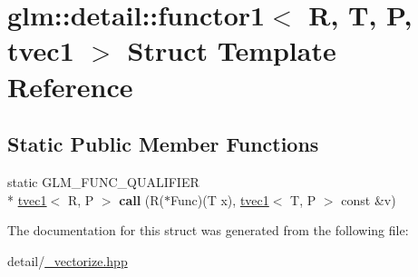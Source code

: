 \hypertarget{structglm_1_1detail_1_1functor1_3_01R_00_01T_00_01P_00_01tvec1_01_4}{\section{glm\-:\-:detail\-:\-:functor1$<$ R, T, P, tvec1 $>$ Struct Template Reference}
\label{structglm_1_1detail_1_1functor1_3_01R_00_01T_00_01P_00_01tvec1_01_4}
}
\subsection*{Static Public Member Functions}
\begin{DoxyCompactItemize}
\item 
\hypertarget{structglm_1_1detail_1_1functor1_3_01R_00_01T_00_01P_00_01tvec1_01_4_af5dd270c9695023917f2c43e61fa10e0}{static G\-L\-M\-\_\-\-F\-U\-N\-C\-\_\-\-Q\-U\-A\-L\-I\-F\-I\-E\-R \\*
\hyperlink{structglm_1_1tvec1}{tvec1}$<$ R, P $>$ {\bfseries call} (R($\ast$Func)(T x), \hyperlink{structglm_1_1tvec1}{tvec1}$<$ T, P $>$ const \&v)}\label{structglm_1_1detail_1_1functor1_3_01R_00_01T_00_01P_00_01tvec1_01_4_af5dd270c9695023917f2c43e61fa10e0}

\end{DoxyCompactItemize}


The documentation for this struct was generated from the following file\-:\begin{DoxyCompactItemize}
\item 
detail/\hyperlink{__vectorize_8hpp}{\-\_\-vectorize.\-hpp}\end{DoxyCompactItemize}
